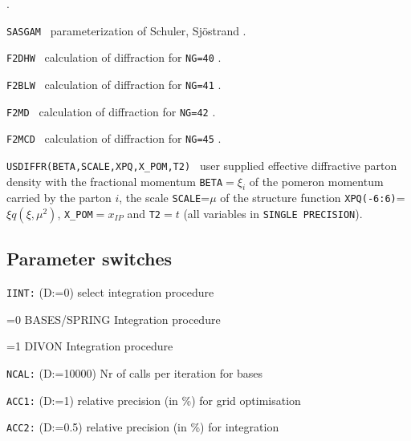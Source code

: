 \documentclass[10pt]{article} \usepackage{dina4}
\newcommand{\pom}{I\!\!P}
\newcommand{\xpom}{x_{\pom}}
\newcommand{\deflab}[1]{#1\hfil}%
\newenvironment{defl}[1]%
  {\begin{list}{}{\settowidth{\labelwidth}{#1}%
  \setlength{\leftmargin}{\labelwidth}%
  \addtolength{\leftmargin}{\labelsep}%
  \setlength{\itemsep}{0pt plus 1pt}
  \setlength{\parsep}{0pt plus 1pt}
  \setlength{\topsep}{0pt plus 1pt}
  \setlength{\partopsep}{0pt plus 1pt}
  \setlength{\parskip}{2mm plus 1mm minus 1mm}
  \let\makelabel\deflab}}%
  {\end{list}}
\begin{document}
\begin{defl}{123456789012345}
                       \cite{GRS}.
\item[{\tt SASGAM }]  parameterization of Schuler, Sj\"ostrand 
                       \cite{Sasgam}.
\item[{\tt F2DHW }] calculation of diffraction for \verb+NG=40+
                     \cite{Wusthoff}.
\item[{\tt F2BLW }] calculation of diffraction for \verb+NG=41+
                     \cite{Bartels_jets,Bartels_asym}.
\item[{\tt F2MD }] calculation of diffraction for \verb+NG=42+
                     \cite{Diehl1,Diehl2}.
\item[{\tt F2MCD }] calculation of diffraction for \verb+NG=45+
                     \cite{Buchmuller_Hebecker_Mcdermott}.       
\item[{\tt USDIFFR(BETA,SCALE,XPQ,X\_POM,T2) }]
          user supplied effective diffractive parton density 
          with the               
          fractional momentum \verb+BETA+$=\xi_i$ of the pomeron momentum 
          carried by the
          parton $i$, the scale \verb+SCALE+=$\mu$
          of the structure function \verb+XPQ(-6:6)+=$\xi q(\xi,\mu^2)$,
          \verb+X_POM+$=\xpom$ and \verb+T2+$=t$ (all variables in 
          \verb+SINGLE PRECISION+).
\end{defl}


\subsection{Parameter switches}
\begin{defl}{123456789012345}
\item[{\tt IINT:}] (D:=0) select integration procedure
\item[]  =0 BASES/SPRING Integration procedure
\item[]  =1 DIVON Integration procedure
\item[{\tt NCAL:}] (D:=10000) Nr of calls per iteration for bases
\item[{\tt ACC1:}] (D:=1)    relative precision (in \%) for grid optimisation
\item[{\tt ACC2:}] (D:=0.5)  relative precision (in \%) for integration
\end{defl}
\end{document}
